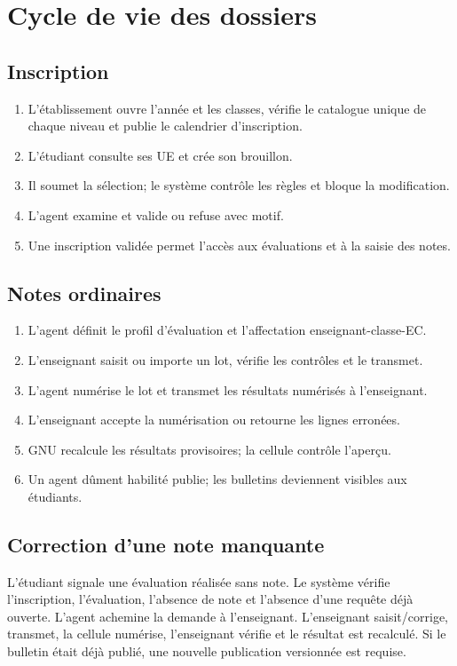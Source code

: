 \documentclass[11pt,a4paper]{article}
\begin{document}
\section{Cycle de vie des dossiers}

\subsection{Inscription}
\begin{enumerate}
  \item L'établissement ouvre l'année et les classes, vérifie le catalogue unique de chaque niveau et publie le calendrier d'inscription.
  \item L'étudiant consulte ses UE et crée son brouillon.
  \item Il soumet la sélection; le système contrôle les règles et bloque la modification.
  \item L'agent examine et valide ou refuse avec motif.
  \item Une inscription validée permet l'accès aux évaluations et à la saisie des notes.
\end{enumerate}

\subsection{Notes ordinaires}
\begin{enumerate}
  \item L'agent définit le profil d'évaluation et l'affectation enseignant-classe-EC.
  \item L'enseignant saisit ou importe un lot, vérifie les contrôles et le transmet.
  \item L'agent numérise le lot et transmet les résultats numérisés à l'enseignant.
  \item L'enseignant accepte la numérisation ou retourne les lignes erronées.
  \item GNU recalcule les résultats provisoires; la cellule contrôle l'aperçu.
  \item Un agent dûment habilité publie; les bulletins deviennent visibles aux étudiants.
\end{enumerate}

\subsection{Correction d'une note manquante}
L'étudiant signale une évaluation réalisée sans note. Le système vérifie l'inscription, l'évaluation, l'absence de note et l'absence d'une requête déjà ouverte. L'agent achemine la demande à l'enseignant. L'enseignant saisit/corrige, transmet, la cellule numérise, l'enseignant vérifie et le résultat est recalculé. Si le bulletin était déjà publié, une nouvelle publication versionnée est requise.
\end{document}
